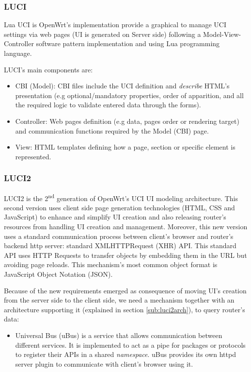 

\subsubsection{LUCI}
Lua UCI is OpenWrt's implementation provide a graphical to manage UCI settings via web pages (UI is generated on Server side) following a Model-View-Controller software pattern implementation and using Lua programming language.

LUCI's main components are:
\begin{itemize}
    \item CBI (Model): CBI files include the UCI definition and \textit{describe} HTML's presentation (e.g optional/mandatory properties, order of apparition, and all the required logic to validate entered data through the forms).
    \item Controller: Web pages definition (e.g data, pages order or rendering target) and communication functions required by the Model (CBI) page.
    \item View: HTML templates defining how a page, section or specific element is represented.
\end{itemize}

\subsubsection{LUCI2}
\label{sub:sub:luci2}
LUCI2 is the 2\textsuperscript{nd} generation of OpenWrt's UCI UI modeling architecture. This second version uses client side page generation technologies (HTML, CSS and JavaScript) to enhance and simplify UI creation and also releasing router's resources from handling UI creation and management. Moreover, this new version uses a standard communication process between client's browser and router's backend http server: standard XMLHTTPRequest (XHR) API. This standard API uses HTTP Requests to transfer objects by embedding them in the URL but avoiding page reloads. This mechanism's most common object format is JavaScript Object Notation (JSON).

Because of the new requirements emerged as consequence of moving UI's creation from the server side to the client side, we need a mechanism together with an architecture supporting it (explained in section \ref{sub:luci2arch}), to query router's data:
\begin{itemize}
    \item Universal Bus (uBus) is a service that allows communication between different services. It is implemented to act as a pipe for packages or protocols to register their APIs in a shared \textit{namespace}. uBus provides its own httpd server plugin to communicate with client's browser using it.
\end{itemize} 

